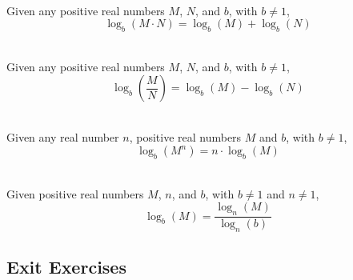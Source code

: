 \begin{myDefinition}~\\[0.5mm]
Given any positive real numbers $M$, $N$, and $b$, with $b\neq 1$,
\[\log_b\left(M\cdot N\right) = \log_b(M)+\log_b(N)\]
\end{myDefinition}

\begin{myDefinition}~\\[0.5mm]
Given any positive real numbers $M$, $N$, and $b$, with $b\neq 1$,
\[\log_b\left(\dfrac{M}{N}\right) = \log_b(M)-\log_b(N)\]
\end{myDefinition}

\begin{myDefinition}~\\[0.5mm]
Given any real number $n$, positive real numbers $M$ and $b$, with $b\neq 1$,
\[\log_b\left(M^n\right) = n\cdot \log_b(M)\]
\end{myDefinition}

\begin{myDefinition}~\\[0.5mm]
Given positive real numbers $M$, $n$, and $b$, with $b\neq 1$ and $n\neq1$,
\[\log_b(M) = \dfrac{ \log_n(M)}{\log_n(b)}\]
\end{myDefinition}





 \newpage

\subsection*{Exit Exercises} \label{exit-logarithms-properties}



